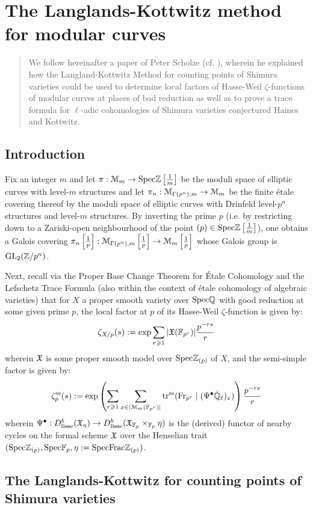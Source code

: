 \chapter{The Langlands-Kottwitz method for modular curves}
    \begin{abstract}
        We follow hereinafter a paper of Peter Scholze (cf. \cite{scholze_langlands_kottwitz_for_modular_curves}), wherein he explained how the Langland-Kottwitz Method for counting points of Shimura varieties could be used to determine local factors of Hasse-Weil $\zeta$-functions of modular curves at places of bad reduction as well as to prove a trace formula for $\ell$-adic cohomologies of Shimura varieties conjectured Haines and Kottwitz.
    \end{abstract}
    
    \minitoc
    
    \section{Introduction}
        Fix an integer $m$ and let $\pi: \mathcal{M}_m \to \mathrm{Spec} \mathbb{Z}\left[\frac1m\right]$ be the moduli space of elliptic curves with level-$m$ structures and let $\pi_n: \mathcal{M}_{\Gamma(p^n), m} \to \mathcal{M}_m$ be the finite \'etale covering thereof by the moduli space of elliptic curves with Drinfeld level-$p^n$ structures and level-$m$ structures. By inverting the prime $p$ (i.e. by restricting down to a Zariski-open neighbourhood of the point $(p) \in \mathrm{Spec} \mathbb{Z}\left[\frac1m\right]$), one obtains a Galois covering $\pi_n\left[\frac1p\right]: \mathcal{M}_{\Gamma(p^n), m}\left[\frac1p\right] \to \mathcal{M}_m\left[\frac1p\right]$ whose Galois group is $\operatorname{GL}_2(\mathbb{Z}/p^n)$.
        
        Next, recall via the Proper Base Change Theorem for \'Etale Cohomology and the Lefschetz Trace Formula (also within the context of \'etale cohomology of algebraic varieties) that for $X$ a proper smooth variety over $\mathrm{Spec} \mathbb{Q}$ with good reduction at some given prime $p$, the local factor at $p$ of its Hasse-Weil $\zeta$-function is given by:
            $$\zeta_{X/p}(s) := \exp \sum_{r \geqslant 1} |\mathfrak{X}(\mathbb{F}_{p^r})| \frac{p^{-rs}}{r}$$
        wherein $\mathfrak{X}$ is some proper smooth model over $\mathrm{Spec} \mathbb{Z}_{(p)}$ of $X$, and the semi-simple factor is given by:
            $$\zeta_p^{\mathrm{ss}}(s) := \exp\left( \sum_{r \geqslant 1} \sum_{x \in |\mathcal{M}_m(\mathbb{F}_{p^r})|} \operatorname{tr}^{\mathrm{ss}}(\mathrm{Fr}_{p^r} \mid ( \Psi^{\bullet} \bar{\mathbb{Q}}_{\ell})_x) \right) \frac{p^{-rs}}{r}$$
        wherein $\Psi^{\bullet}: D_{\lisse}^b(\frakX_{\eta}) \to D_{\lisse}^b(\frakX_{\F_p} \x_{\F_p} \eta)$ is the (derived) functor of nearby cycles on the formal scheme $\mathfrak{X}$ over the Henselian trait $(\mathrm{Spec} \mathbb{Z}_{(p)}, \mathrm{Spec} \mathbb{F}_p, \eta := \mathrm{Spec} \mathrm{Frac} \mathbb{Z}_{(p)})$. 
    
    \section{The Langlands-Kottwitz for counting points of Shimura varieties}